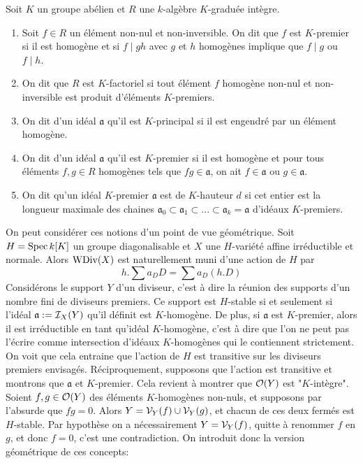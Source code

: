 \begin{defn}
Soit $K$ un groupe abélien et $R$ une $k$-algèbre $K$-graduée intègre.
\begin{enumerate}
\item Soit $f\in R$ un élément non-nul et non-inversible. On dit que $f$ est $K$-premier si il est homogène et si $f\mid gh$ avec $g$ et $h$ homogènes implique que $f\mid g$ ou $f\mid h$.
\item On dit que $R$ est $K$-factoriel si tout élément $f$ homogène non-nul et non-inversible est produit d'éléments $K$-premiers.
\item On dit d'un idéal $\mathfrak{a}$ qu'il est $K$-principal si il est engendré par un élément homogène.
\item On dit d'un idéal $\mathfrak{a}$ qu'il est $K$-premier si il est homogène et pour tous éléments $f,g\in R$ homogènes tels que $fg\in\mathfrak{a}$, on ait $f\in\mathfrak{a}$ ou $g\in\mathfrak{a}$.
\item On dit qu'un idéal $K$-premier $\mathfrak{a}$ est de $K$-hauteur $d$ si cet entier est la longueur maximale des chaines $\mathfrak{a}_0\subset \mathfrak{a}_1\subset ...\subset \mathfrak{a}_k=\mathfrak{a}$ d'idéaux $K$-premiers.
\end{enumerate}
\end{defn}

On peut considérer ces notions d'un point de vue géométrique. Soit $H=\operatorname{Spec} k[K]$ un groupe diagonalisable et $X$ une $H$-variété affine irréductible et normale. Alors $\operatorname{WDiv}(X)$ est naturellement muni d'une action de $H$ par 
$$h.\sum a_DD=\sum a_D(h.D)$$
Considérons le support $Y$ d'un diviseur, c'est à dire la réunion des supports d'un nombre fini de diviseurs premiers. Ce support est $H$-stable si et seulement si l'idéal $\mathfrak{a}:=\mathcal{I}_X(Y)$ qu'il définit est $K$-homogène. De plus, si $\mathfrak{a}$ est $K$-premier, alors il est irréductible en tant qu'idéal $K$-homogène, c'est à dire que l'on ne peut pas l'écrire comme intersection d'idéaux $K$-homogènes qui le contiennent strictement. On voit que cela entraine que l'action de $H$ est transitive sur les diviseurs premiers envisagés. Réciproquement, supposons que l'action est transitive et montrons que $\mathfrak{a}$ et $K$-premier. Cela revient à montrer que $\mathcal{O}(Y)$ est "$K$-intègre". Soient $f,g\in \mathcal{O}(Y)$ des éléments $K$-homogènes non-nuls, et supposons par l'absurde que $fg=0$. Alors $Y=\mathcal{V}_Y(f)\cup\mathcal{V}_Y(g)$, et chacun de ces deux fermés est $H$-stable. Par hypothèse on a nécessairement $Y=\mathcal{V}_Y(f)$, quitte à renommer $f$ en $g$, et donc $f=0$, c'est une contradiction. On introduit donc la version géométrique de ces concepts:

